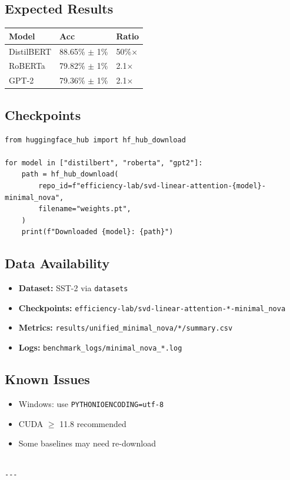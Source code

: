 \subsection{Expected Results}

\begin{table}[H]
\centering
\small
\begin{tabular}{lll}
\toprule
\textbf{Model} & \textbf{Acc} & \textbf{Ratio} \\
\midrule
DistilBERT & 88.65\% $\pm$ 1\% & 50\%$\times$ \\
RoBERTa & 79.82\% $\pm$ 1\% & 2.1$\times$ \\
GPT-2 & 79.36\% $\pm$ 1\% & 2.1$\times$ \\
\bottomrule
\end{tabular}
\end{table}

\subsection{Checkpoints}

\begin{lstlisting}
from huggingface_hub import hf_hub_download

for model in ["distilbert", "roberta", "gpt2"]:
    path = hf_hub_download(
        repo_id=f"efficiency-lab/svd-linear-attention-{model}-minimal_nova",
        filename="weights.pt",
    )
    print(f"Downloaded {model}: {path}")
\end{lstlisting}

\subsection{Data Availability}

\begin{itemize}
\item \textbf{Dataset:} SST-2 via \texttt{datasets}
\item \textbf{Checkpoints:} \texttt{efficiency-lab/svd-linear-attention-*-minimal\_nova}
\item \textbf{Metrics:} \texttt{results/unified\_minimal\_nova/*/summary.csv}
\item \textbf{Logs:} \texttt{benchmark\_logs/minimal\_nova\_*.log}

\end{itemize}
\subsection{Known Issues}

\begin{itemize}
\item Windows: use \texttt{PYTHONIOENCODING=utf-8}
\item CUDA $\ge$ 11.8 recommended
\item Some baselines may need re-download
\end{itemize}
\begin{lstlisting}

---
\end{lstlisting}